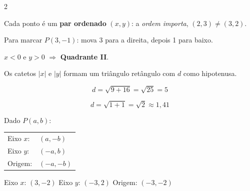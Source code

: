 \documentclass[12pt,twoside]{article}
\begin{document}
\begin{multicols}{2}

Cada ponto é um \textbf{par ordenado} $(x, y)$: a \emph{ordem importa},
$(2,3) \neq (3,2)$.

Para marcar $P(3,-1)$: mova 3 para a direita, depois 1 para baixo.


$x < 0$ e $y > 0$ $\Rightarrow$ \textbf{Quadrante II}.



Os catetos $|x|$ e $|y|$ formam um triângulo retângulo com $d$ como hipotenusa.


$$d = \sqrt{9+16} = \sqrt{25} = \boxed{5}$$


$$d = \sqrt{1+1} = \sqrt{2} \approx 1{,}41$$


Dado $P(a, b)$:

\begin{tabular}{ll}
Eixo $x$: & $(a, -b)$ \\
Eixo $y$: & $(-a, b)$ \\
Origem: & $(-a, -b)$
\end{tabular}


Eixo $x$: $(3,-2)$ \quad Eixo $y$: $(-3,2)$ \quad Origem: $(-3,-2)$


\end{multicols}


\end{document}
